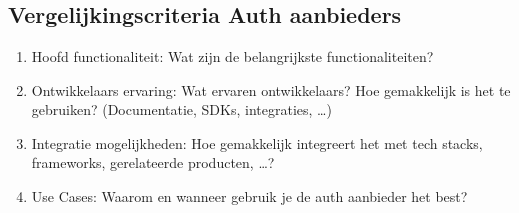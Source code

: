 
\chapter{}%
\label{ch:methodologie}



\section{Vergelijkingscriteria Auth aanbieders}%
\label{sec:vergelijkingscriteria-auth-aanbieders}

\begin{enumerate}
  \item Hoofd functionaliteit: Wat zijn de belangrijkste functionaliteiten?
  \item Ontwikkelaars ervaring: Wat ervaren ontwikkelaars? Hoe gemakkelijk is het te gebruiken? (Documentatie, SDKs, integraties, \ldots)
  \item Integratie mogelijkheden: Hoe gemakkelijk integreert het met tech stacks, frameworks, gerelateerde producten, \ldots?
  \item Use Cases: Waarom en wanneer gebruik je de auth aanbieder het best?
\end{enumerate}


